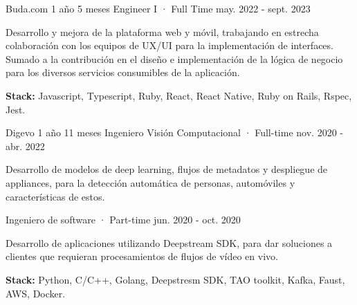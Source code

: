 

\begin{cventries}

  \cventry
    {Buda.com} %
    {1 año 5 meses} %
    {Engineer I · Full Time } %
    {may. 2022 - sept. 2023} %
    {
      \begin{cvitems} 
        \item {Desarrollo y mejora de la plataforma web y móvil, trabajando en estrecha colaboración con los equipos de UX/UI para la implementación de interfaces. Sumado a la contribución en el diseño e implementación de la lógica de negocio para los diversos servicios consumibles de la aplicación.}
        \item {\textbf{Stack:} Javascript, Typescript, Ruby, React, React Native, Ruby on Rails, Rspec, Jest.}
      \end{cvitems}
    }
  
  \cvmultientry
    {Digevo} %
    {1 año 11 meses}
    {Ingeniero Visión Computacional · Full-time} %
    {nov. 2020 - abr. 2022} %
    {
      \begin{cvitems} %
          \item {Desarrollo de modelos de deep learning, flujos de metadatos y despliegue de appliances, para la detección automática de personas, automóviles y características de estos.}
      \end{cvitems}
    }
    {Ingeniero de software · Part-time} %
    {jun. 2020 - oct. 2020} %
    {
      \begin{cvitems} %
            \item {Desarrollo de aplicaciones utilizando Deepstream SDK, para dar soluciones a clientes que requieran procesamientos de flujos de vídeo en vivo.}
      \end{cvitems}
    }
    {
      \begin{cvitems} %
            \item {\textbf{Stack:} Python, C/C++, Golang, Deepstresm SDK, TAO toolkit, Kafka, Faust, AWS, Docker.}
      \end{cvitems}
    }

\end{cventries}



    


